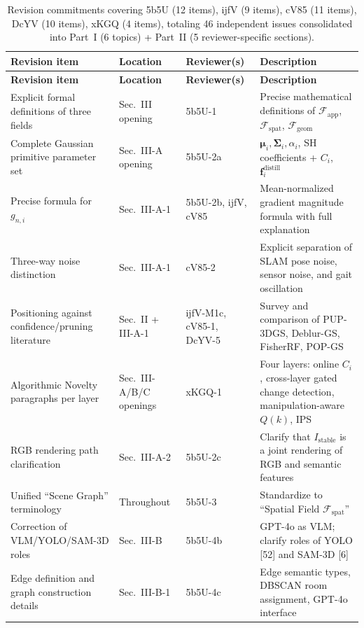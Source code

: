 \documentclass[10pt,a4paper]{article}
\begin{document}
\small
\begin{longtable}{L{3.6cm}L{2.6cm}L{1.8cm}L{5.8cm}}
\toprule
\textbf{Revision item} & \textbf{Location} & \textbf{Reviewer(s)} & \textbf{Description}\\
\midrule
\endfirsthead
\toprule
\textbf{Revision item} & \textbf{Location} & \textbf{Reviewer(s)} & \textbf{Description}\\
\midrule
\endhead
\bottomrule
\endfoot
\bottomrule
\caption{\small Revision commitments covering 5b5U (12 items), ijfV (9 items), cV85 (11 items), DcYV (10 items), xKGQ (4 items), totaling 46 independent issues consolidated into Part~I (6 topics) + Part~II (5 reviewer-specific sections).}
\endlastfoot
Explicit formal definitions of three fields & Sec.~III opening & 5b5U-1 & Precise mathematical definitions of $\mathcal{F}_{\text{app}}$, $\mathcal{F}_{\text{spat}}$, $\mathcal{F}_{\text{geom}}$\\
Complete Gaussian primitive parameter set & Sec.~III-A opening & 5b5U-2a & $\boldsymbol{\mu}_i,\boldsymbol{\Sigma}_i,\alpha_i$, SH coefficients + $C_i$, $\mathbf{f}_i^{\text{distill}}$\\
Precise formula for $g_{n,i}$ & Sec.~III-A-1 & 5b5U-2b, ijfV, cV85 & Mean-normalized gradient magnitude formula with full explanation\\
Three-way noise distinction & Sec.~III-A-1 & cV85-2 & Explicit separation of SLAM pose noise, sensor noise, and gait oscillation\\
Positioning against confidence/pruning literature & Sec.~II + III-A-1 & ijfV-M1c, cV85-1, DcYV-5 & Survey and comparison of PUP-3DGS, Deblur-GS, FisherRF, POP-GS\\
Algorithmic Novelty paragraphs per layer & Sec.~III-A/B/C openings & xKGQ-1 & Four layers: online $C_i$, cross-layer gated change detection, manipulation-aware $Q(k)$, IPS\\
RGB rendering path clarification & Sec.~III-A-2 & 5b5U-2c & Clarify that $I_{\text{stable}}$ is a joint rendering of RGB and semantic features\\
Unified ``Scene Graph'' terminology & Throughout & 5b5U-3 & Standardize to ``Spatial Field $\mathcal{F}_{\text{spat}}$''\\
Correction of VLM/YOLO/SAM-3D roles & Sec.~III-B & 5b5U-4b & GPT-4o as VLM; clarify roles of YOLO [52] and SAM-3D [6]\\
Edge definition and graph construction details & Sec.~III-B-1 & 5b5U-4c & Edge semantic types, DBSCAN room assignment, GPT-4o interface\\

\end{longtable}
\end{document}
